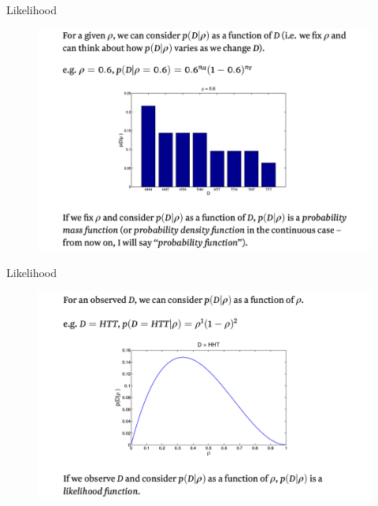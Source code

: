 \documentclass{beamer}
\begin{document}
\begin{frame}{Likelihood}

        \begin{figure}
                \includegraphics[width=\linewidth]{like5.png}
        \end{figure}

\end{frame}
\begin{frame}{Likelihood}

        \begin{figure}
                \includegraphics[width=\linewidth]{like6.png}
        \end{figure}

\end{frame}
\end{document}
